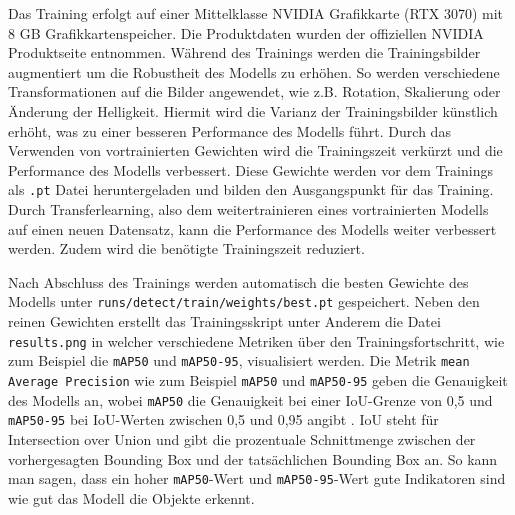 Das Training erfolgt auf einer Mittelklasse NVIDIA Grafikkarte (RTX 3070) mit 8 GB Grafikkartenspeicher. Die Produktdaten wurden der offiziellen NVIDIA Produktseite entnommen.\cite{RTX3070Specs} Während des Trainings werden die Trainingsbilder augmentiert um die Robustheit des Modells zu erhöhen. So werden verschiedene Transformationen auf die Bilder angewendet, wie z.B. Rotation, Skalierung oder Änderung der Helligkeit. Hiermit wird die Varianz der Trainingsbilder künstlich erhöht, was zu einer besseren Performance des Modells führt. \cite{YoloDataAugmentation} Durch das Verwenden von vortrainierten Gewichten wird die Trainingszeit verkürzt und die Performance des Modells verbessert. Diese Gewichte werden vor dem Trainings als \texttt{.pt} Datei heruntergeladen und bilden den Ausgangspunkt für das Training. Durch Transferlearning, also dem weitertrainieren eines vortrainierten Modells auf einen neuen Datensatz, kann die Performance des Modells weiter verbessert werden. Zudem wird die benötigte Trainingszeit reduziert. \cite{TransferLearningGlossary}


Nach Abschluss des Trainings werden automatisch die besten Gewichte des Modells unter \texttt{runs/detect/train/weights/best.pt} gespeichert. Neben den reinen Gewichten erstellt das Trainingsskript unter Anderem die Datei \texttt{results.png} in welcher verschiedene Metriken über den Trainingsfortschritt, wie zum Beispiel die \texttt{mAP50} und \texttt{mAP50-95}, visualisiert werden. Die Metrik \texttt{mean Average Precision} wie zum Beispiel \texttt{mAP50} und \texttt{mAP50-95} geben die Genauigkeit des Modells an, wobei \texttt{mAP50} die Genauigkeit bei einer IoU-Grenze von 0,5 und \texttt{mAP50-95} bei IoU-Werten zwischen 0,5 und 0,95 angibt \cite{MAPGlossary}. IoU steht für Intersection over Union und gibt die prozentuale Schnittmenge zwischen der vorhergesagten Bounding Box und der tatsächlichen Bounding Box an.\cite{IOUGlossary}
So kann man sagen, dass ein hoher \texttt{mAP50}-Wert und \texttt{mAP50-95}-Wert gute Indikatoren sind wie gut das Modell die Objekte erkennt. \newpage



